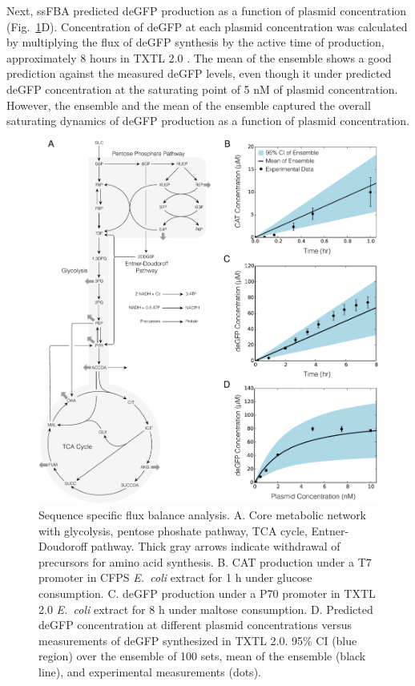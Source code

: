 \documentclass[journal=asbcd6,manuscript=article]{achemso}
\begin{document}
Next, ssFBA predicted deGFP production as a function of plasmid concentration (Fig.~\ref{fig:network}D).
Concentration of deGFP at each plasmid concentration was calculated by multiplying the flux of deGFP synthesis by the active time of production, approximately 8 hours in TXTL 2.0 \cite{Garamella:2016aa}.
The mean of the ensemble shows a good prediction against the measured deGFP levels, even though it under predicted deGFP concentration at the saturating point of 5 nM of plasmid concentration.
However, the ensemble and the mean of the ensemble captured the overall saturating dynamics of deGFP production as a function of plasmid concentration.
\begin{figure}[t!]
\centering
\includegraphics[width=1.00\textwidth]{./Figures/ssFBA_network.pdf}
\caption{Sequence specific flux balance analysis. A. Core metabolic network with glycolysis, pentose phoshate pathway, TCA cycle, Entner-Doudoroff pathway. Thick gray arrows indicate withdrawal of precursors for amino acid synthesis. B. CAT production under a T7 promoter in CFPS \textit{E.~coli} extract for 1 h under glucose consumption. C. deGFP production under a P70 promoter in TXTL 2.0 \textit{E.~coli} extract for 8 h under maltose consumption. D. Predicted deGFP concentration at different plasmid concentrations versus measurements of deGFP synthesized in TXTL 2.0. 95\% CI (blue region) over the ensemble of 100 sets, mean of the ensemble (black line), and experimental measurements (dots).}
\label{fig:network}
\end{figure}
\end{document}
